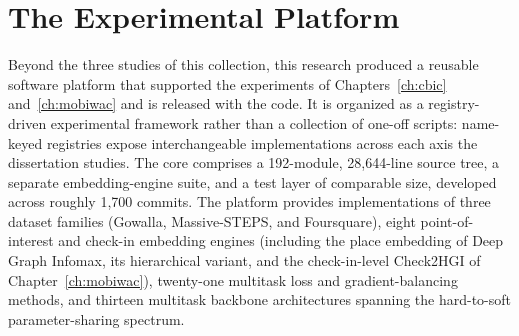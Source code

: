 \chapter{The Experimental Platform}
\label{apx:contributions:platform}
Beyond the three studies of this collection, this research produced a reusable software
platform that supported the experiments of Chapters~\ref{ch:cbic}
and~\ref{ch:mobiwac} and is released with the code.
It is organized as a registry-driven experimental framework rather than a
collection of one-off scripts: name-keyed registries expose interchangeable
implementations across each axis the dissertation studies. The core comprises a
192-module, 28{,}644-line source tree, a separate embedding-engine suite, and a test
layer of comparable size, developed across roughly 1{,}700 commits. The platform
provides implementations of three dataset families (Gowalla, Massive-STEPS, and
Foursquare), eight point-of-interest and check-in embedding engines (including the
place embedding of Deep Graph Infomax, its hierarchical variant, and the
check-in-level Check2HGI of Chapter~\ref{ch:mobiwac}), twenty-one multitask loss and
gradient-balancing methods, and thirteen multitask backbone architectures spanning
the hard-to-soft parameter-sharing spectrum.

